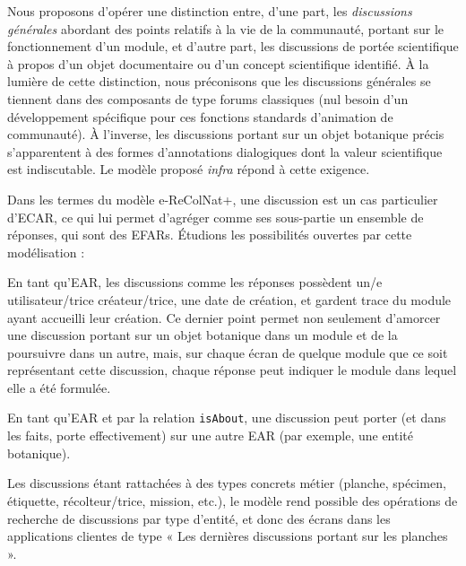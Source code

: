 \startchapter[title={Le modèle de discussions}]

\startsection[title={Discussions ciblées & discussions générales}]

Nous proposons d'opérer une distinction entre, d'une part, les {\em discussions générales} abordant des points relatifs à la vie de la communauté, portant sur le fonctionnement d'un module, et d'autre part, les discussions de portée scientifique à propos d'un objet documentaire ou d'un concept scientifique identifié.
À la lumière de cette distinction, nous préconisons que les discussions générales se tiennent dans des composants de type forums classiques (nul besoin d'un développement spécifique pour ces fonctions standards d'animation de communauté).
À l'inverse, les discussions portant sur un objet botanique précis s'apparentent à des formes d'annotations dialogiques dont la valeur scientifique est indiscutable.
Le modèle proposé {\it infra} répond à cette exigence.

\stopsection
\startsection[title={Le modèle de discussions},reference=model:discussions]


Dans les termes du modèle e-ReColNat+, une discussion est un cas particulier d'ECAR, ce qui lui permet d'agréger comme ses sous-partie un ensemble de réponses, qui sont des EFARs.
Étudions les possibilités ouvertes par cette modélisation :

\startitemize
\item En tant qu'EAR, les discussions comme les réponses possèdent un/e utilisateur/trice créateur/trice, une date de création, et gardent trace du module ayant accueilli leur création. Ce dernier point permet non seulement d'amorcer une discussion portant sur un objet botanique dans un module et de la poursuivre dans un autre, mais, sur chaque écran de quelque module que ce soit représentant cette discussion, chaque réponse peut indiquer le module dans lequel elle a été formulée.
\item En tant qu'EAR et par la relation {\tt isAbout}, une discussion peut porter (et dans les faits, porte effectivement) sur une autre EAR (par exemple, une entité botanique).
\item Les discussions étant rattachées à des types concrets métier (planche, spécimen, étiquette, récolteur/trice, mission, etc.), le modèle rend possible des opérations de recherche de discussions par type d'entité, et donc des écrans dans les applications clientes de type « Les dernières discussions portant sur les planches ».
\stopitemize

\stopsection
\stopchapter